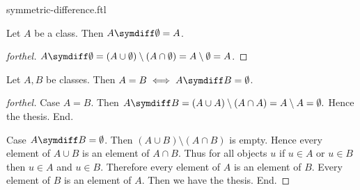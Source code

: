 \documentclass{naproche-library}
\begin{document}
\begin{smodule}{symmetric-difference.ftl}
  \begin{proposition}[forthel,id=FOUNDATIONS_03_6698730398941184,printid]
    Let $A$ be a class.
    Then $A \symdiff \emptyset = A$.
  \end{proposition}
  \begin{proof}[forthel]
    $A \symdiff \emptyset
      = (A \cup \emptyset) \setminus (A \cap \emptyset)
      = A \setminus \emptyset
      = A$.
  \end{proof}

  \begin{proposition}[forthel,id=FOUNDATIONS_03_6111806917443584,printid]
    Let $A, B$ be classes.
    Then $A = B \iff A \symdiff B = \emptyset$.
  \end{proposition}
  \begin{proof}[forthel]
    Case $A = B$.
      Then $A \symdiff B
        = (A \cup A) \setminus (A \cap A)
        = A \setminus A
        = \emptyset.$
      Hence the thesis.
    End.

    Case $A \symdiff B = \emptyset$.
      Then $(A \cup B) \setminus (A \cap B)$ is empty.
      Hence every element of $A \cup B$ is an element of $A \cap B$.
      Thus for all objects $u$ if $u \in A$ or $u \in B$ then $u \in A$ and $u \in B$.
      Therefore every element of $A$ is an element of $B$.
      Every element of $B$ is an element of $A$.
      Then we have the thesis.
    End.
  \end{proof}
\end{smodule}
\end{document}
